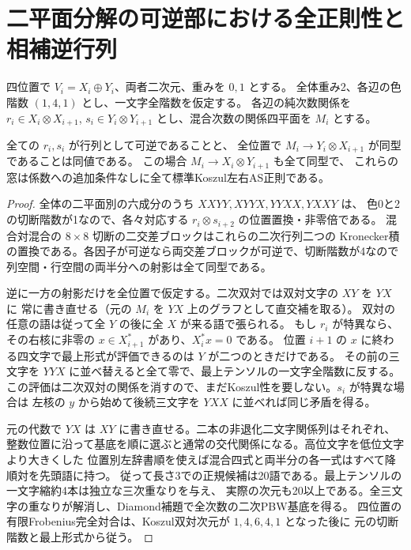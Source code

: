\section{二平面分解の可逆部における全正則性と相補逆行列}
\label{sec:split-inverse-windows}
四位置で $V_i=X_i\oplus Y_i$、両者二次元、重みを $0,1$ とする。
全体重み2、各辺の色階数 $(1,4,1)$ とし、一文字全階数を仮定する。
各辺の純次数関係を $r_i\in X_i\otimes X_{i+1}$,
$s_i\in Y_i\otimes Y_{i+1}$ とし、混合次数の関係四平面を $M_i$ とする。
\begin{theorem}\label{thm:split-inverse-regularity}
全ての $r_i,s_i$ が行列として可逆であることと、
全位置で $M_i\to Y_i\otimes X_{i+1}$ が同型であることは同値である。
この場合 $M_i\to X_i\otimes Y_{i+1}$ も全て同型で、
これらの窓は係数への追加条件なしに全て標準Koszul左右AS正則である。
\end{theorem}
\begin{proof}
全体の二平面別の六成分のうち $XXYY, XYYX, YYXX,YXXY$ は、
色0と2の切断階数が1なので、各々対応する $r_i\otimes s_{i+2}$ の位置置換・非零倍である。
混合対混合の $8\times8$ 切断の二交差ブロックはこれらの二次行列二つの
Kronecker積の置換である。各因子が可逆なら両交差ブロックが可逆で、切断階数が4なので
列空間・行空間の両半分への射影は全て同型である。

逆に一方の射影だけを全位置で仮定する。二次双対では双対文字の $XY$ を $YX$ に
常に書き直せる（元の $M_i$ を $YX$ 上のグラフとして直交補を取る）。
双対の任意の語は従って全 $Y$ の後に全 $X$ が来る語で張られる。
もし $r_i$ が特異なら、その右核に非零の $x\in X_{i+1}^*$ があり、$X_i^*x=0$ である。
位置 $i+1$ の $x$ に終わる四文字で最上形式が評価できるのは $Y$ が二つのときだけである。
その前の三文字を $YYX$ に並べ替えると全て零で、最上テンソルの一文字全階数に反する。
この評価は二次双対の関係を消すので、まだKoszul性を要しない。$s_i$ が特異な場合は
左核の $y$ から始めて後続三文字を $YXX$ に並べれば同じ矛盾を得る。

元の代数で $YX$ は $XY$ に書き直せる。二本の非退化二文字関係列はそれぞれ、
整数位置に沿って基底を順に選ぶと通常の交代関係になる。高位文字を低位文字より大きくした
位置別左辞書順を使えば混合四式と両半分の各一式はすべて降順対を先頭語に持つ。
従って長さ3での正規候補は20語である。最上テンソルの一文字縮約4本は独立な三次重なりを与え、
実際の次元も20以上である。全三文字の重なりが解消し、Diamond補題で全次数の二次PBW基底を得る。
四位置の有限Frobenius完全対合は、Koszul双対次元が $1,4,6,4,1$ となった後に
元の切断階数と最上形式から従う。
\end{proof}

